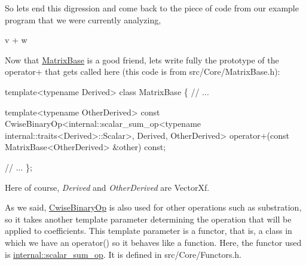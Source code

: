 So let\textquotesingle{}s end this digression and come back to the piece of code from our example program that we were currently analyzing,


\begin{DoxyCode}
v + w
\end{DoxyCode}


Now that \hyperlink{group___core___module_class_eigen_1_1_matrix_base}{Matrix\+Base} is a good friend, let\textquotesingle{}s write fully the prototype of the operator+ that gets called here (this code is from src/\+Core/\+Matrix\+Base.\+h)\+:


\begin{DoxyCode}
\textcolor{keyword}{template}<\textcolor{keyword}{typename} Derived>
\textcolor{keyword}{class }MatrixBase
\{
  \textcolor{comment}{// ...}

  \textcolor{keyword}{template}<\textcolor{keyword}{typename} OtherDerived>
  \textcolor{keyword}{const} CwiseBinaryOp<internal::scalar\_sum\_op<typename internal::traits<Derived>::Scalar>, Derived, 
      OtherDerived>
  operator+(\textcolor{keyword}{const} MatrixBase<OtherDerived> &other) \textcolor{keyword}{const};

  \textcolor{comment}{// ...}
\};
\end{DoxyCode}


Here of course, {\itshape Derived} and {\itshape Other\+Derived} are Vector\+Xf.

As we said, \hyperlink{group___core___module_class_eigen_1_1_cwise_binary_op}{Cwise\+Binary\+Op} is also used for other operations such as substration, so it takes another template parameter determining the operation that will be applied to coefficients. This template parameter is a functor, that is, a class in which we have an operator() so it behaves like a function. Here, the functor used is \hyperlink{struct_eigen_1_1internal_1_1scalar__sum__op}{internal\+::scalar\+\_\+sum\+\_\+op}. It is defined in src/\+Core/\+Functors.\+h.

